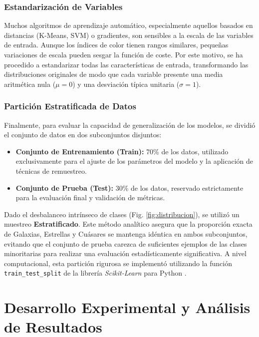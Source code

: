 \documentclass[12pt, a4paper]{report}
\begin{document}
\subsection{Estandarización de Variables}
Muchos algoritmos de aprendizaje automático, especialmente aquellos basados en distancias (K-Means, SVM) o gradientes, son sensibles a la escala de las variables de entrada. Aunque los índices de color tienen rangos similares, pequeñas variaciones de escala pueden sesgar la función de coste. Por este motivo, se ha procedido a estandarizar todas las características de entrada, transformando las distribuciones originales de modo que cada variable presente una media aritmética nula ($\mu = 0$) y una desviación típica unitaria ($\sigma = 1$).

\subsection{Partición Estratificada de Datos}
Finalmente, para evaluar la capacidad de generalización de los modelos, se dividió el conjunto de datos en dos subconjuntos disjuntos:
\begin{itemize}
    \item \textbf{Conjunto de Entrenamiento (Train):} 70\% de los datos, utilizado exclusivamente para el ajuste de los parámetros del modelo y la aplicación de técnicas de remuestreo.
    \item \textbf{Conjunto de Prueba (Test):} 30\% de los datos, reservado estrictamente para la evaluación final y validación de métricas.
\end{itemize}

Dado el desbalanceo intrínseco de clases (Fig. \ref{fig:distribucion}), se utilizó un muestreo \textbf{Estratificado}. Este método analítico asegura que la proporción exacta de Galaxias, Estrellas y Cuásares se mantenga idéntica en ambos subconjuntos, evitando que el conjunto de prueba carezca de suficientes ejemplos de las clases minoritarias para realizar una evaluación estadísticamente significativa. A nivel computacional, esta partición rigurosa se implementó utilizando la función \texttt{train\_test\_split} de la librería \textit{Scikit-Learn} para Python \citep{scikit-learn}.

\chapter{Desarrollo Experimental y Análisis de Resultados}
\label{chap:resultados}
\end{document}
